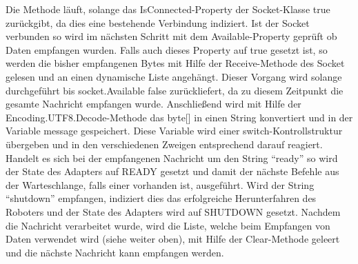 Die Methode läuft, solange das IsConnected-Property der Socket-Klasse true zurückgibt, da dies eine bestehende Verbindung indiziert. Ist der Socket verbunden so wird im nächsten Schritt mit dem Available-Property geprüft ob Daten empfangen wurden. Falls auch dieses Property auf true gesetzt ist, so werden die bisher empfangenen Bytes mit Hilfe der Receive-Methode des Socket gelesen und an einen dynamische Liste angehängt. 
Dieser Vorgang wird solange durchgeführt bis socket.Available false zurückliefert, da zu diesem Zeitpunkt die gesamte Nachricht empfangen wurde. 
Anschließend wird mit Hilfe der Encoding.UTF8.Decode-Methode das byte[] in einen String konvertiert und in der Variable message gespeichert.
Diese Variable wird einer switch-Kontrollstruktur übergeben und in den verschiedenen Zweigen entsprechend darauf reagiert. 
Handelt es sich bei der empfangenen Nachricht um den String “ready” so wird der State des Adapters auf READY gesetzt und damit der nächste Befehle aus der Warteschlange, falls einer vorhanden ist, ausgeführt.
Wird der String “shutdown” empfangen, indiziert dies das erfolgreiche Herunterfahren des Roboters und der State des Adapters wird auf SHUTDOWN gesetzt. Nachdem die Nachricht verarbeitet wurde, wird die Liste, welche beim Empfangen von Daten verwendet wird (siehe weiter oben), mit Hilfe der Clear-Methode geleert und die nächste Nachricht kann empfangen werden.